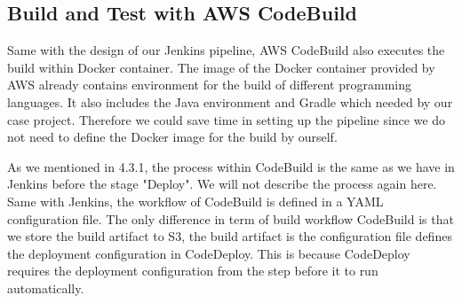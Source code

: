 \subsection{Build and Test with AWS CodeBuild}
Same with the design of our Jenkins pipeline, AWS CodeBuild also executes the build within Docker container. The image of the Docker container provided by AWS already contains environment for the build of different programming languages. It also includes the Java environment and Gradle which needed by our case project. Therefore we could save time in setting up the pipeline since we do not need to define the Docker image for the build by ourself.
\par
As we mentioned in 4.3.1, the process within CodeBuild is the same as we have in Jenkins before the stage "Deploy". We will not describe the process again here. Same with Jenkins, the workflow of CodeBuild is defined in a YAML configuration file. The only difference in term of build workflow CodeBuild is that we store the build artifact to S3, the build artifact is the configuration file defines the deployment configuration in CodeDeploy. This is because CodeDeploy requires the deployment configuration from the step before it to run automatically.

